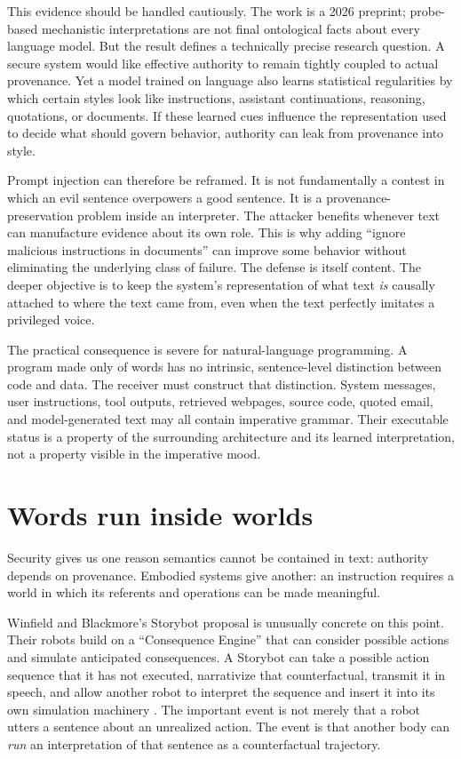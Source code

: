 \documentclass[11pt]{article}
\begin{document}
This evidence should be handled cautiously. The work is a 2026 preprint; probe-based mechanistic interpretations are not final ontological facts about every language model. But the result defines a technically precise research question. A secure system would like effective authority to remain tightly coupled to actual provenance. Yet a model trained on language also learns statistical regularities by which certain styles look like instructions, assistant continuations, reasoning, quotations, or documents. If these learned cues influence the representation used to decide what should govern behavior, authority can leak from provenance into style.

Prompt injection can therefore be reframed. It is not fundamentally a contest in which an evil sentence overpowers a good sentence. It is a provenance-preservation problem inside an interpreter. The attacker benefits whenever text can manufacture evidence about its own role. This is why adding ``ignore malicious instructions in documents'' can improve some behavior without eliminating the underlying class of failure. The defense is itself content. The deeper objective is to keep the system's representation of what text \emph{is} causally attached to where the text came from, even when the text perfectly imitates a privileged voice.

The practical consequence is severe for natural-language programming. A program made only of words has no intrinsic, sentence-level distinction between code and data. The receiver must construct that distinction. System messages, user instructions, tool outputs, retrieved webpages, source code, quoted email, and model-generated text may all contain imperative grammar. Their executable status is a property of the surrounding architecture and its learned interpretation, not a property visible in the imperative mood.

\section{Words run inside worlds}

Security gives us one reason semantics cannot be contained in text: authority depends on provenance. Embodied systems give another: an instruction requires a world in which its referents and operations can be made meaningful.

Winfield and Blackmore's Storybot proposal is unusually concrete on this point. Their robots build on a ``Consequence Engine'' that can consider possible actions and simulate anticipated consequences. A Storybot can take a possible action sequence that it has not executed, narrativize that counterfactual, transmit it in speech, and allow another robot to interpret the sequence and insert it into its own simulation machinery \parencite{winfield2022artificialculture}. The important event is not merely that a robot utters a sentence about an unrealized action. The event is that another body can \emph{run} an interpretation of that sentence as a counterfactual trajectory.
\end{document}
